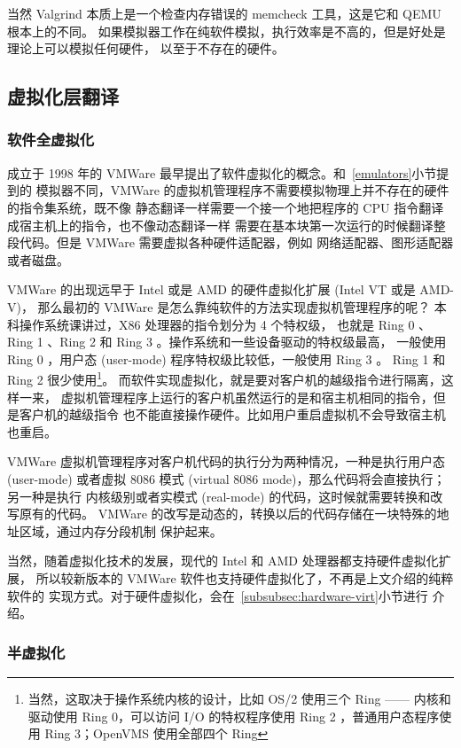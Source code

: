 当然 Valgrind 本质上是一个检查内存错误的 memcheck 工具，这是它和 QEMU 根本上的不同。
如果模拟器工作在纯软件模拟，执行效率是不高的，但是好处是理论上可以模拟任何硬件，
以至于不存在的硬件。

\subsection{虚拟化层翻译}

\subsubsection{软件全虚拟化}
\label{subsubsec:software-virt}

成立于 1998 年的 VMWare 最早提出了软件虚拟化的概念。和~\ref{emulators}小节提到的
模拟器不同，VMWare 的虚拟机管理程序不需要模拟物理上并不存在的硬件的指令集系统，既不像
静态翻译一样需要一个接一个地把程序的 CPU 指令翻译成宿主机上的指令，也不像动态翻译一样
需要在基本块第一次运行的时候翻译整段代码。但是 VMWare 需要虚拟各种硬件适配器，例如
网络适配器、图形适配器或者磁盘。

VMWare 的出现远早于 Intel 或是 AMD 的硬件虚拟化扩展 (Intel VT 或是 AMD-V)，
那么最初的 VMWare 是怎么靠纯软件的方法实现虚拟机管理程序的呢？
本科操作系统课讲过，X86 处理器的指令划分为 4 个特权级，
也就是 Ring 0 、Ring 1 、Ring 2 和 Ring 3 。操作系统和一些设备驱动的特权级最高，
一般使用 Ring 0 ，用户态 (user-mode) 程序特权级比较低，一般使用 Ring 3 。
Ring 1 和 Ring 2 很少使用\footnote{当然，这取决于操作系统内核的设计，比如
OS/2 使用三个 Ring —— 内核和驱动使用 Ring 0，可以访问 I/O 的特权程序使用
Ring 2 ，普通用户态程序使用 Ring 3；OpenVMS 使用全部四个 Ring}。
而软件实现虚拟化，就是要对客户机的越级指令进行隔离，这样一来，
虚拟机管理程序上运行的客户机虽然运行的是和宿主机相同的指令，但是客户机的越级指令
也不能直接操作硬件。比如用户重启虚拟机不会导致宿主机也重启。

VMWare 虚拟机管理程序对客户机代码的执行分为两种情况，一种是执行用户态 (user-mode)
或者虚拟 8086 模式 (virtual 8086 mode)，那么代码将会直接执行；另一种是执行
内核级别或者实模式 (real-mode) 的代码，这时候就需要转换和改写原有的代码。
VMWare 的改写是动态的，转换以后的代码存储在一块特殊的地址区域，通过内存分段机制
保护起来。

当然，随着虚拟化技术的发展，现代的 Intel 和 AMD 处理器都支持硬件虚拟化扩展，
所以较新版本的 VMWare 软件也支持硬件虚拟化了，不再是上文介绍的纯粹软件的
实现方式。对于硬件虚拟化，会在~\ref{subsubsec:hardware-virt}小节进行
介绍。

\subsubsection{半虚拟化}
\label{subsubsec:paravirtualization}

